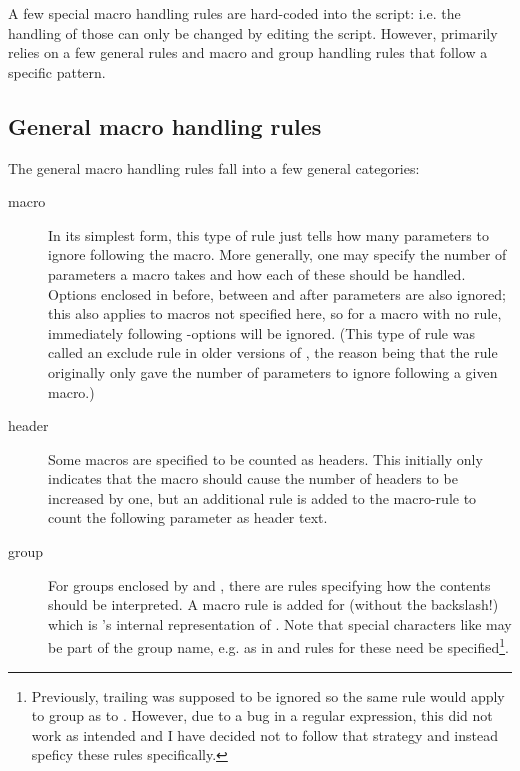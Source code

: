 \documentclass{article}
\begin{document}
A few special macro handling rules are hard-coded into the \TeXcount{} script: i.e. the handling of those can only be changed by editing the script. However, \TeXcount{} primarily relies on a few general rules and macro and group handling rules that follow a specific pattern.

\subsection{General macro handling rules}

The general macro handling rules fall into a few general categories:

\begin{description}

\item[macro]In its simplest form, this type of rule just tells how many parameters to ignore following the macro. More generally, one may specify the number of parameters a macro takes and how each of these should be handled. Options enclosed in \code{[]} before, between and after parameters are also ignored; this also applies to macros not specified here, so for a macro with no rule, immediately following \code{[]}-options will be ignored. (This type of rule was called an exclude rule in older versions of \TeXcount{}, the reason being that the rule originally only gave the number of
parameters to ignore following a given macro.)

\item[header]Some macros are specified to be counted as headers. This initially only indicates that the macro should cause the number of headers to be increased by one, but an additional rule is added to the macro-rule to count the following parameter as header text.

\item[group]For groups enclosed by  and , there are rules specifying how the contents should be interpreted. A macro rule is added for  (without the backslash!) which is \TeXcount{}'s internal representation of . Note that special characters like \code{*} may be part of the group name, e.g. as in  and rules for these need be specified\footnote{Previously, trailing \code{*} was supposed to be ignored so the same rule would apply to group  as to . However, due to a bug in a regular expression, this did not work as intended and I have decided not to follow that strategy and instead speficy these rules specifically.}.


\end{description}
\end{document}
